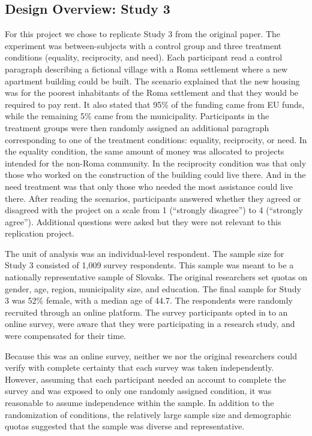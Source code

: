 \documentclass[titlepage]{article}
\begin{document}
\subsection{Design Overview: Study 3}
For this project we chose to replicate Study 3 from the original paper. The experiment was between-subjects with a control group and three treatment conditions (equality, reciprocity, and need). Each participant read a control paragraph describing a fictional village with a Roma settlement where a new apartment building could be built. The scenario explained that the new housing was for the poorest inhabitants of the Roma settlement and that they would be required to pay rent. It also stated that 95\% of the funding came from EU funds, while the remaining 5\% came from the municipality. Participants in the treatment groups were then randomly assigned an additional paragraph corresponding to one of the treatment conditions: equality, reciprocity, or need. In the equality condition, the same amount of money was allocated to projects intended for the non-Roma community. In the reciprocity condition was that only those who worked on the construction of the building could live there. And in the need treatment was that only those who needed the most assistance could live there. After reading the scenarios, participants answered whether they agreed or disagreed with the project on a scale from 1 (“strongly disagree”) to 4 (“strongly agree”). Additional questions were asked but they were not relevant to this replication project.

\justify
The unit of analysis was an individual-level respondent. The sample size for Study 3 consisted of 1,009 survey respondents. This sample was meant to be a nationally representative sample of Slovaks. The original researchers set quotas on gender, age, region, municipality size, and education. The final sample for Study 3 was 52\% female, with a median age of 44.7. The respondents were randomly recruited through an online platform. The survey participants opted in to an online survey, were aware that they were participating in a research study, and were compensated for their time.

\justify
Because this was an online survey, neither we nor the original researchers could verify with complete certainty that each survey was taken independently. However, assuming that each participant needed an account to complete the survey and was exposed to only one randomly assigned condition, it was reasonable to assume independence within the sample. In addition to the randomization of conditions, the relatively large sample size and demographic quotas suggested that the sample was diverse and representative.
\end{document}

